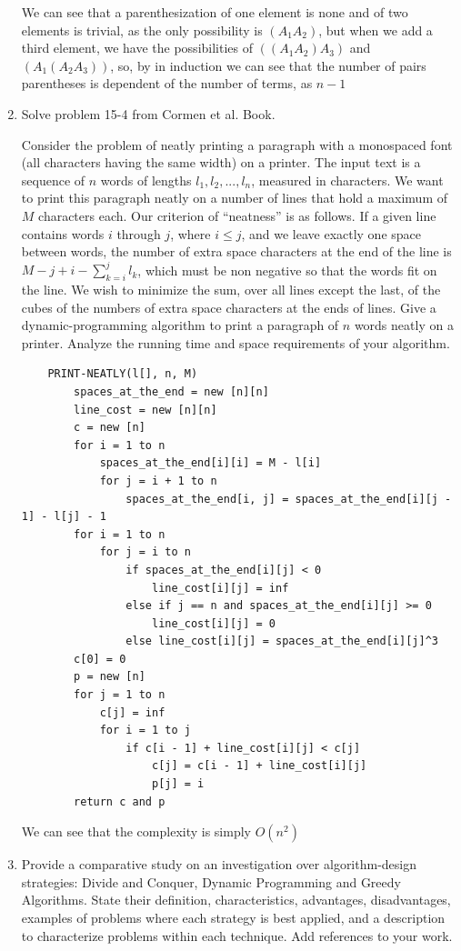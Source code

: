 \documentclass{article}
\begin{document}
\begin{enumerate}
    We can see that a parenthesization of one element is none and of two elements is trivial, as the only possibility is $(A_1A_2)$, but when we add a third element, we have the possibilities of $((A_1A_2)A_3)$ and $(A_1(A_2A_3))$, so, by in induction we can see that the number of pairs parentheses is dependent of the number of terms, as $n -1$
    \pagebreak
    \item Solve problem 15-4 from Cormen et al. Book.

    Consider the problem of neatly printing a paragraph with a monospaced font (all characters having the same width) on a printer. The input text is a sequence of $n$ words of lengths $l_1, l_2, ... , l_n$, measured in characters. We want to print this paragraph neatly on a number of lines that hold a maximum of $M$ characters each. Our criterion of “neatness” is as follows. If a given line contains words $i$ through $j$, where $i \leq j$, and we leave exactly one space between words, the number of extra space characters at the end of the line is $M - j + i - \sum_{k=i}^{j}l_k$, which must be non negative so that the words fit on the line. We wish to minimize the sum, over all lines except the last, of the cubes of the numbers of extra space characters at the ends of lines. Give a dynamic-programming algorithm to print a paragraph of $n$ words neatly on a printer. Analyze the running time and space requirements of your algorithm.
    \begin{lstlisting}
    PRINT-NEATLY(l[], n, M)
        spaces_at_the_end = new [n][n]
        line_cost = new [n][n]
        c = new [n]
        for i = 1 to n
            spaces_at_the_end[i][i] = M - l[i]
            for j = i + 1 to n
                spaces_at_the_end[i, j] = spaces_at_the_end[i][j - 1] - l[j] - 1
        for i = 1 to n
            for j = i to n
                if spaces_at_the_end[i][j] < 0
                    line_cost[i][j] = inf
                else if j == n and spaces_at_the_end[i][j] >= 0
                    line_cost[i][j] = 0
                else line_cost[i][j] = spaces_at_the_end[i][j]^3
        c[0] = 0
        p = new [n]
        for j = 1 to n
            c[j] = inf
            for i = 1 to j
                if c[i - 1] + line_cost[i][j] < c[j]
                    c[j] = c[i - 1] + line_cost[i][j]
                    p[j] = i
        return c and p
    \end{lstlisting}

    We can see that the complexity is simply $O(n^2)$

    \item Provide a comparative study on an investigation over algorithm-design strategies: Divide and Conquer, Dynamic Programming and Greedy Algorithms. State their definition, characteristics, advantages, disadvantages, examples of problems where each strategy is best applied, and a description to characterize problems within each technique. Add references to your work.

\end{enumerate}
\end{document}
